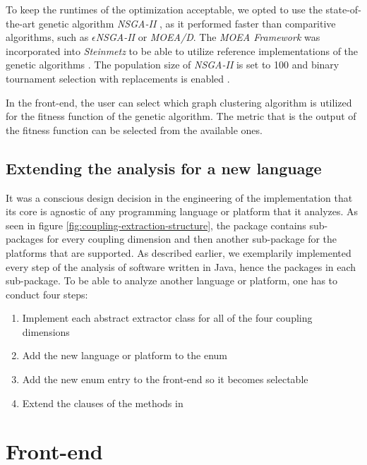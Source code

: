 \documentclass[12pt,a4paper]{report}
\begin{document}
To keep the runtimes of the optimization acceptable, we opted to use the
state\hyp of\hyp the\hyp art genetic algorithm \textit{NSGA-II}
\cite{zitzler2001spea2, li2008multiobjective}, as it performed faster than
comparitive algorithms, such as \textit{$\epsilon$NSGA-II} or \textit{MOEA/D}.
The \textit{MOEA Framework} was incorporated into \textit{Steinmetz} to be able
to utilize reference implementations of the genetic algorithms
\cite{hadka2016beginner}.
The population size of \textit{NSGA-II} is set to 100 and binary
tournament selection with replacements is enabled \cite{hadka2016beginner}.

In the front\hyp end, the user can select which graph clustering algorithm is
utilized for the fitness function of the genetic algorithm.
The metric that is the output of the fitness function can be selected from the
available ones.


\subsection{Extending the analysis for a new language}

It was a conscious design decision in the engineering of the implementation
that its core is agnostic of any programming language or platform that it
analyzes. As seen in figure \ref{fig:coupling-extraction-structure}, the  package contains sub\hyp packages for every coupling
dimension and then another sub\hyp package for the platforms that are
supported. As described earlier, we exemplarily implemented every step of the
analysis of software written in Java, hence the  packages in each
 sub\hyp package. To be able to analyze another language or
platform, one has to conduct four steps:
\begin{enumerate}
    \item Implement each abstract extractor class for all of the four coupling dimensions
    \item Add the new language or platform to the  enum
    \item Add the new enum entry to the front-end so it becomes selectable
    \item Extend the clauses of the methods in 
\end{enumerate}



\section{Front-end} \label{sect:implementation-front-end}
\end{document}
